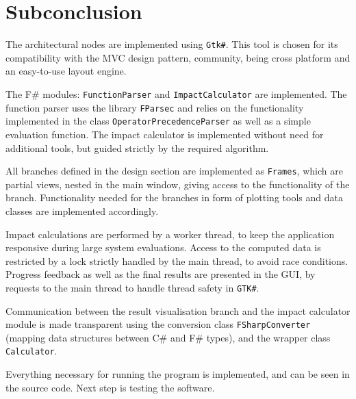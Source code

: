 \section{Subconclusion}\label{sec:Implementation-Subconclusion}
The architectural nodes are implemented using \texttt{Gtk\#}. This tool is chosen for its compatibility with the MVC design pattern, community, being cross platform and an easy-to-use layout engine.

The F\# modules: \texttt{FunctionParser} and \texttt{ImpactCalculator} are implemented. The function parser uses the library \texttt{FParsec} and relies on the functionality implemented in the class \texttt{OperatorPrecedenceParser} as well as a simple evaluation function. The impact calculator is implemented without need for additional tools, but guided strictly by the required algorithm.

All branches defined in the design section are implemented as \texttt{Frames}, which are partial views, nested in the main window, giving access to the functionality of the branch. Functionality needed for the branches in form of plotting tools and data classes are implemented accordingly. 

Impact calculations are performed by a worker thread, to keep the application responsive during large system evaluations. Access to the computed data is restricted by a lock strictly handled by the main thread, to avoid race conditions. Progress feedback as well as the final results are presented in the GUI, by requests to the main thread to handle thread safety in \texttt{GTK\#}.

Communication between the result visualisation branch and the impact calculator module is made transparent using the conversion class \texttt{FSharpConverter} (mapping data structures between C\# and F\# types), and the wrapper class \texttt{Calculator}.

Everything necessary for running the program is implemented, and can be seen in the source code. Next step is testing the software.